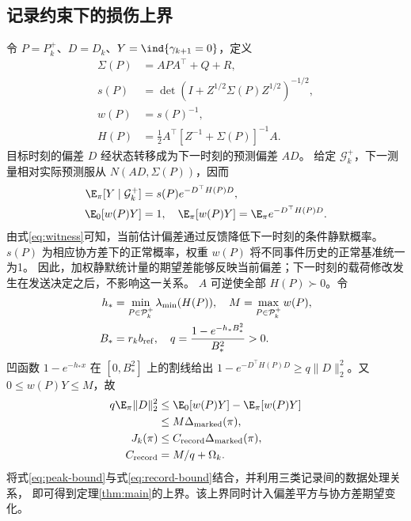 \subsection{记录约束下的损伤上界}
令 $P=P_k^+$、$D=D_k$、$Y=\ind\{\gamma_{k+1}=0\}$，定义
\begin{equation}
 \begin{aligned}
 \Sigma(P)&=APA^\top+Q+R,\\
 s(P)&=\det(I+Z^{1/2}\Sigma(P)Z^{1/2})^{-1/2},\\
 w(P)&=s(P)^{-1},\\
 H(P)&=\tfrac12 A^\top[Z^{-1}+\Sigma(P)]^{-1}A.
 \end{aligned}
 \label{eq:witness-functions}
\end{equation}
目标时刻的偏差 $D$ 经状态转移成为下一时刻的预测偏差 $AD$。
给定 $\mathcal G_k^+$，下一测量相对实际预测服从 $N(AD,\Sigma(P))$，因而
\begin{equation}
 \begin{aligned}
 \E_\pi[Y\mid\mathcal G_k^+]&=s(P)e^{-D^\top H(P)D},\\
 \E_0[w(P)Y]&=1,\quad
 \E_\pi[w(P)Y]=\E_\pi e^{-D^\top H(P)D}.
 \end{aligned}
 \label{eq:witness}
\end{equation}
由式\eqref{eq:witness}可知，当前估计偏差通过反馈降低下一时刻的条件静默概率。
$s(P)$ 为相应协方差下的正常概率，权重 $w(P)$ 将不同事件历史的正常基准统一为1。
因此，加权静默统计量的期望差能够反映当前偏差；下一时刻的载荷修改发生在发送决定之后，不影响这一关系。
$A$ 可逆使全部 $H(P)\succ0$。令
\begin{equation}
 \begin{aligned}
 h_*&=\min_{P\in\mathcal P_k^+}\lambda_{\min}(H(P)),\quad
 M=\max_{P\in\mathcal P_k^+}w(P),\\
 B_*&=r_kb_{\rm ref},\quad q=\frac{1-e^{-h_*B_*^2}}{B_*^2}>0.
 \end{aligned}
 \label{eq:witness-constants}
\end{equation}
凹函数 $1-e^{-h_*x}$ 在 $[0,B_*^2]$ 上的割线给出
$1-e^{-D^\top H(P)D}\ge q\|D\|_2^2$。又 $0\le w(P)Y\le M$，故
\begin{equation}
 \begin{aligned}
 q\E_\pi\|D\|_2^2&\le\E_0[w(P)Y]-\E_\pi[w(P)Y]\\
 &\le M\Delta_{\rm marked}(\pi),\\
 J_k(\pi)&\le C_{\rm record}\Delta_{\rm marked}(\pi),\\
 C_{\rm record}&=M/q+\Omega_k.
 \end{aligned}
 \label{eq:record-bound}
\end{equation}
将式\eqref{eq:peak-bound}与式\eqref{eq:record-bound}结合，并利用三类记录间的数据处理关系，
即可得到定理\ref{thm:main}的上界。该上界同时计入偏差平方与协方差期望变化。

